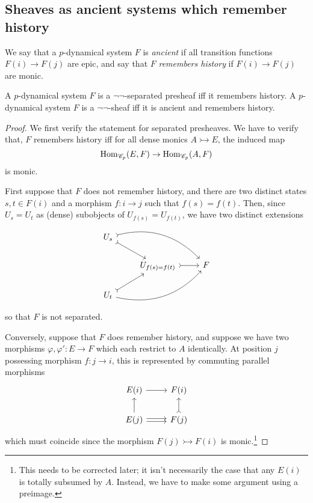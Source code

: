 \documentclass{amsart}
\begin{document}
\subsection{Sheaves as ancient systems which remember history}
We say that a $p$-dynamical system $F$ is \emph{ancient} if all transition functions $F(i) \rightarrow F(j)$ are epic, and say that $F$ \emph{remembers history} if $F(i) \rightarrow F(j)$ are monic.
\begin{proposition}
  A $p$-dynamical system $F$ is a $\neg\neg$-separated presheaf iff it remembers history.
  A $p$-dynamical system $F$ is a $\neg\neg$-sheaf iff it is ancient and remembers history.
\end{proposition}
\begin{proof}
  We first verify the statement for separated presheaves.
  We have to verify that, $F$ remembers history iff for all dense monics $A \rightarrowtail E$, the induced map
  \[
    \operatorname{Hom}_{\mathscr{C}_p}(E,F) \rightarrow \operatorname{Hom}_{\mathscr{C}_p}(A,F)
  \]
  is monic.

  First suppose that $F$ does not remember history, and there are two distinct states $s,t \in F(i)$ and a morphism $f:i \rightarrow j$ such that $f(s) = f(t)$.
  Then, since $U_s = U_t$ as (dense) subobjects of $U_{f(s)} = U_{f(t)}$, we have two distinct extensions
  \[
    \begin{tikzcd}
      U_{s} \arrow[rd,tail] \arrow[rrd,tail, bend left]\\
      & U_{f(s) = f(t)} \arrow[r,tail]& F\\
      U_{t} \arrow[ru,tail] \arrow[rru, bend right]
    \end{tikzcd}
  \]
  so that $F$ is not separated.

  Conversely, suppose that $F$ does remember history, and suppose we have two morphisms $\varphi,\varphi':E \rightarrow F$ which each restrict to $A$ identically.
  At position $j$ possessing morphism $f:j \rightarrow i$, this is represented by commuting parallel morphisms 
  \[
    \begin{tikzcd}
      E(i) \arrow[r]
      & F(i)\\
      E(j) \arrow[u] \arrow[r, transform canvas={yshift = .4ex}]  \arrow[r, transform canvas={yshift = -.4ex}]
      & F(j) \arrow[u,tail]
    \end{tikzcd}
  \]
  which must coincide since the morphism $F(j) \rightarrowtail F(i)$ is monic.\footnote{\color{magenta} This needs to be corrected later;
it isn't necessarily the case that any $E(i)$ is totally subsumed by $A$.
Instead, we have to make some argument using a preimage.} 

   
\end{proof}
\end{document}
